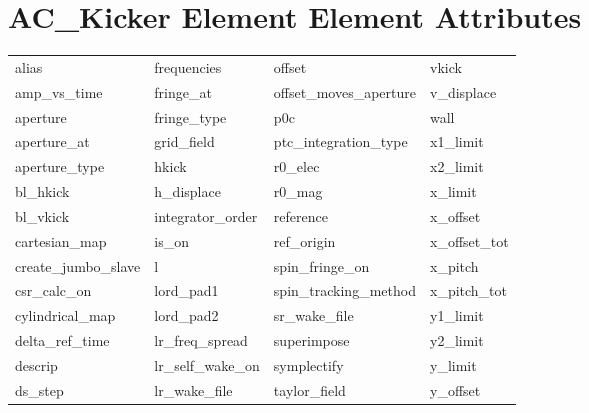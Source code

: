  \section{AC_Kicker Element Element Attributes}
 \label{s:list.ac.kicker}
 
 \begin{tabular}{llll} \toprule
alias                       & frequencies                 & offset                      & vkick                       \\
amp_vs_time                 & fringe_at                   & offset_moves_aperture       & v_displace                  \\
aperture                    & fringe_type                 & p0c                         & wall                        \\
aperture_at                 & grid_field                  & ptc_integration_type        & x1_limit                    \\
aperture_type               & hkick                       & r0_elec                     & x2_limit                    \\
bl_hkick                    & h_displace                  & r0_mag                      & x_limit                     \\
bl_vkick                    & integrator_order            & reference                   & x_offset                    \\
cartesian_map               & is_on                       & ref_origin                  & x_offset_tot                \\
create_jumbo_slave          & l                           & spin_fringe_on              & x_pitch                     \\
csr_calc_on                 & lord_pad1                   & spin_tracking_method        & x_pitch_tot                 \\
cylindrical_map             & lord_pad2                   & sr_wake_file                & y1_limit                    \\
delta_ref_time              & lr_freq_spread              & superimpose                 & y2_limit                    \\
descrip                     & lr_self_wake_on             & symplectify                 & y_limit                     \\
ds_step                     & lr_wake_file                & taylor_field                & y_offset                    \\

\end{tabular}

